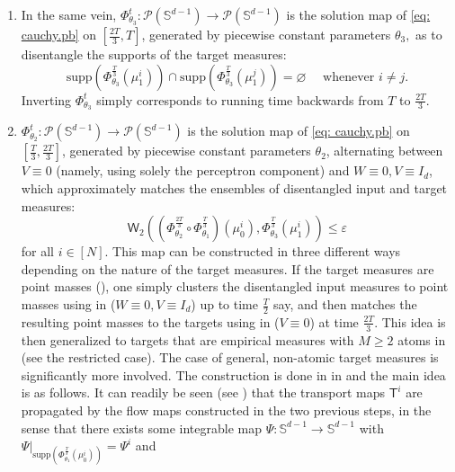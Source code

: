 \documentclass[a4paper,11pt]{article}
\theoremstyle{plain}
\newcommand{\supp}{\mathrm{supp}}
\renewcommand{\S}{\mathbb{S}^{d-1}}
\newcommand{\bW}{\bm{\mathit{W}}}
\newcommand{\bV}{\bm{\mathit{V}}}
\renewcommand{\leq}{\leqslant}
\renewcommand{\geq}{\geqslant}
\numberwithin{equation}{section}
\newcommand{\nddrb}[1]{ {\text{{\bf drb:}} \color{magenta}{#1} } }
\newcommand{\ndpr}[1]{ {\colorbox{MIT}{\color{white} \textsf{PR}} \color{MIT}{#1}} }
\begin{document}
\begin{enumerate}
\item In the same vein, $\Phi_{\theta_3}^t:\mathscr{P}(\S)\to\mathscr{P}(\S)$ is the solution map of \eqref{eq: cauchy.pb} on $[\frac{2T}{3}, T]$, %
generated by piecewise constant parameters $\theta_3,$ %
 as to disentangle the supports of the target measures:
\begin{equation*}
\supp\left(\Phi_{\theta_3}^{\frac{T}{3}}(\mu_1^i)\right)\cap\supp\left(\Phi_{\theta_3}^{\frac{T}{3}}(\mu_1^j)\right)=\varnothing\quad\text{ whenever }i\neq j.
\end{equation*}
Inverting $\Phi_{\theta_3}^t$ simply corresponds to running time backwards from $T$ to $\frac{2T}{3}$.
\item $\Phi_{\theta_2}^t:\mathscr{P}(\S)\to\mathscr{P}(\S)$ is the solution map of \eqref{eq: cauchy.pb} on $[\frac{T}{3},\frac{2T}{3}]$, generated by piecewise constant parameters $\theta_2$, alternating between $\bV\equiv0$ (namely, using solely the perceptron component) and $\bW\equiv0, \bV\equiv I_d$, which approximately matches the ensembles of disentangled input and target measures: 
\begin{equation*}
    \mathsf{W}_2\left(\left(\Phi_{\theta_2}^{\frac{2T}{3}}\circ\Phi_{\theta_1}^{\frac{T}{3}}\right)(\mu_0^i),\Phi_{\theta_3}^{\frac{T}{3}}(\mu_1^i)\right)\leq\varepsilon
\end{equation*}
for all $i\in[N]$. This map can be constructed in three different ways depending on the nature of the target measures. If the target measures are point masses (), one simply clusters the disentangled input measures to point masses using  in {\bf {}} ($\bW\equiv0, \bV\equiv I_d$) up to time $\frac{T}{2}$ say, and then matches the resulting point masses to the targets using  in {\bf {}} ($\bV\equiv0$) at time $\frac{2T}{3}$. 
This idea is then generalized to targets that are empirical measures with $M\geq 2$ atoms in {\bf {}} (see the restricted case). 
The case of general, non-atomic target measures is significantly more involved. The construction is done in  in {\bf {}} and the main idea is as follows. It can readily be seen (see ) that the transport maps $\mathsf{T}^i$ are propagated by the flow maps constructed in the two previous steps, in the sense that there exists some integrable map $\Psi:\S\to\S$ with $\Psi|_{\supp (\Phi_{\theta_1}^{\frac{T}{3}}(\mu_0^i))}=\Psi^i$ and 

\end{enumerate}
\end{document}
